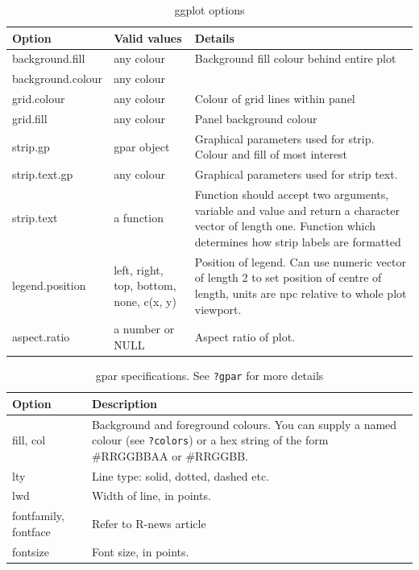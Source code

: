 \begin{table}
\begin{tabular}{lll}
Option & Valid values & Details \\
\hline
background.fill    & any colour & Background fill colour behind entire plot\\
background.colour  & any colour & \\
grid.colour        & any colour & Colour of grid lines within panel \\
grid.fill          & any colour & Panel background colour \\
strip.gp           & gpar object & Graphical parameters used for strip. Colour and fill of most interest \\
strip.text.gp      & any colour & Graphical parameters used for strip text. \\
strip.text         & a function & Function should accept two arguments, variable and value and return a character vector of length one. Function which determines how strip labels are formatted \\
legend.position    & left, right, top, bottom, none, c(x, y) & Position of legend.  Can use numeric vector of length 2 to set position of centre of length, units are npc relative to whole plot viewport. \\
aspect.ratio       & a number or NULL & Aspect ratio of plot. \\
\hline
\end{tabular}
  \caption{ggplot options}
  \label{tbl:options}
\end{table}

\begin{table}
  \begin{center}
  \begin{tabular}{ll}
  Option & Description \\
  \hline
  fill, col & Background and foreground colours.  You can supply a named colour (see {\tt ?colors}) or a hex string of the form \#RRGGBBAA or \#RRGGBB. \\
  lty & Line type: solid, dotted, dashed etc. \\
  lwd & Width of line, in points. \\
  fontfamily, fontface & Refer to R-news article \\
  fontsize & Font size, in points.  
    
  \end{tabular}
  \end{center}
  \caption{gpar specifications.  See {\tt ?gpar} for more details}
  \label{tbl:gpar}
\end{table}

